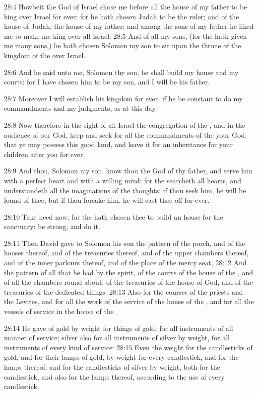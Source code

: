28:4 Howbeit the \LORD God of Israel chose me before all the house of
my father to be king over Israel for ever: for he hath chosen Judah to
be the ruler; and of the house of Judah, the house of my father; and
among the sons of my father he liked me to make me king over all
Israel: 28:5 And of all my sons, (for the \LORD hath given me many
sons,) he hath chosen Solomon my son to sit upon the throne of the
kingdom of the \LORD over Israel.

28:6 And he said unto me, Solomon thy son, he shall build my house and
my courts: for I have chosen him to be my son, and I will be his
father.

28:7 Moreover I will establish his kingdom for ever, if he be constant
to do my commandments and my judgments, as at this day.

28:8 Now therefore in the sight of all Israel the congregation of the
\LORD, and in the audience of our God, keep and seek for all the
commandments of the \LORD your God: that ye may possess this good land,
and leave it for an inheritance for your children after you for ever.

28:9 And thou, Solomon my son, know thou the God of thy father, and
serve him with a perfect heart and with a willing mind: for the \LORD
searcheth all hearts, and understandeth all the imaginations of the
thoughts: if thou seek him, he will be found of thee; but if thou
forsake him, he will cast thee off for ever.

28:10 Take heed now; for the \LORD hath chosen thee to build an house
for the sanctuary: be strong, and do it.

28:11 Then David gave to Solomon his son the pattern of the porch, and
of the houses thereof, and of the treasuries thereof, and of the upper
chambers thereof, and of the inner parlours thereof, and of the place
of the mercy seat, 28:12 And the pattern of all that he had by the
spirit, of the courts of the house of the \LORD, and of all the
chambers round about, of the treasuries of the house of God, and of
the treasuries of the dedicated things: 28:13 Also for the courses of
the priests and the Levites, and for all the work of the service of
the house of the \LORD, and for all the vessels of service in the house
of the \LORD.

28:14 He gave of gold by weight for things of gold, for all
instruments of all manner of service; silver also for all instruments
of silver by weight, for all instruments of every kind of service:
28:15 Even the weight for the candlesticks of gold, and for their
lamps of gold, by weight for every candlestick, and for the lamps
thereof: and for the candlesticks of silver by weight, both for the
candlestick, and also for the lamps thereof, according to the use of
every candlestick.

